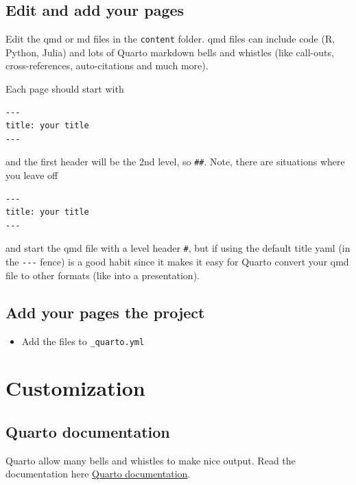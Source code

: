 \documentclass[
  letterpaper,
  oneside,
  open=any]{scrbook}
\providecommand{\tightlist}{%
  \setlength{\itemsep}{0pt}\setlength{\parskip}{0pt}}\usepackage{longtable,booktabs,array}
\begin{document}
\section{Edit and add your pages}\label{edit-and-add-your-pages}

Edit the qmd or md files in the \texttt{content} folder. qmd files can
include code (R, Python, Julia) and lots of Quarto markdown bells and
whistles (like call-outs, cross-references, auto-citations and much
more).

Each page should start with

\begin{verbatim}
---
title: your title
---
\end{verbatim}

and the first header will be the 2nd level, so \texttt{\#\#}. Note,
there are situations where you leave off

\begin{verbatim}
---
title: your title
---
\end{verbatim}

and start the qmd file with a level header \texttt{\#}, but if using the
default title yaml (in the \texttt{-\/-\/-} fence) is a good habit since
it makes it easy for Quarto convert your qmd file to other formats (like
into a presentation).

\section{Add your pages the project}\label{add-your-pages-the-project}

\begin{itemize}
\tightlist
\item
  Add the files to \texttt{\_quarto.yml}
\end{itemize}


\chapter{Customization}\label{customization}

\section{Quarto documentation}\label{quarto-documentation}

Quarto allow many bells and whistles to make nice output. Read the
documentation here \href{https://quarto.org/docs/guide/}{Quarto
documentation}.
\end{document}

